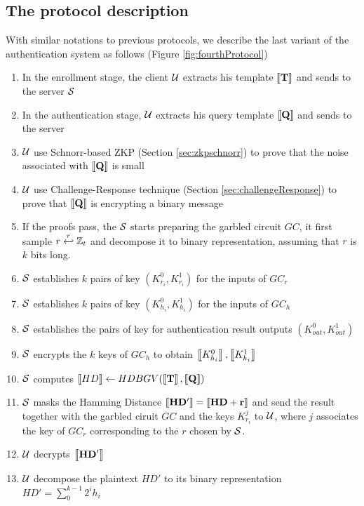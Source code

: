 \subsection{The protocol description}
\label{sec:4thprocSteps}
With similar notations to previous protocols, we describe the last variant of the authentication system as follows (Figure \ref{fig:fourthProtocol})
\begin{enumerate}
\item In the enrollment stage, the client $\mathcal{U}$ extracts his template $\left\llbracket\mathbf{T}\right\rrbracket$ and sends to the server $\mathcal{S}$
\item In the authentication stage, $\mathcal{U}$ extracts his query template $\left\llbracket\mathbf{Q}\right\rrbracket$ and sends to the server
\item $\mathcal{U}$ use Schnorr-based ZKP (Section \ref{sec:zkpschnorr}) to prove that the noise associated with $\left\llbracket\mathbf{Q}\right\rrbracket$ is small
\item $\mathcal{U}$ use Challenge-Response technique (Section \ref{sec:challengeResponse}) to prove that $\left\llbracket\mathbf{Q}\right\rrbracket$ is encrypting a binary message
\item If the proofs pass, the $\mathcal{S}$ starts preparing the garbled circuit $GC$, it first sample $r \stackrel{r}{\hookleftarrow} \mathbb{Z}_{t}$ and decompose it to binary representation, assuming that $r$ is $k$ bits long.
\item $\mathcal{S}$ establishes $k$ pairs of key $(K_{r_{i}}^{0}, K_{r_{i}}^{1})$ for the inputs of $GC_{r}$
\item $\mathcal{S}$ establishes $k$ pairs of key $(K_{h_{i}}^{0}, K_{h_{i}}^{1})$ for the inputs of $GC_{h}$
\item $\mathcal{S}$ establishes the pairs of key for authentication result outputs $(K_{out}^{0}, K_{out}^{1})$
\item $\mathcal{S}$ encrypts the $k$ keys of $GC_{h}$ to obtain $\left\llbracket K_{h_{i}}^{0}\right\rrbracket, \left\llbracket K_{h_{i}}^{1}\right\rrbracket$
\item $\mathcal{S}$ computes $\left\llbracket HD\right\rrbracket \gets HDBGV(\left\llbracket\mathbf{T}\right\rrbracket, \left\llbracket\mathbf{Q}\right\rrbracket)$
\item $\mathcal{S}$ masks the Hamming Distance $\left\llbracket\mathbf{HD'}\right\rrbracket = \left\llbracket\mathbf{HD + r}\right\rrbracket$ and send the result together with the garbled ciruit $GC$ and the keys $K_{r_{i}}^{j}$ to $\mathcal{U}$, where $j$ associates the key of $GC_{r}$ corresponding to the $r$ chosen by $\mathcal{S}$.
\item $\mathcal{U}$ decrypts $\left\llbracket\mathbf{HD}'\right\rrbracket$
\item $\mathcal{U}$ decompose the plaintext $HD'$ to its binary representation $HD' = \sum_{0}^{k-1}2^{i}h_{i}$

\end{enumerate}
